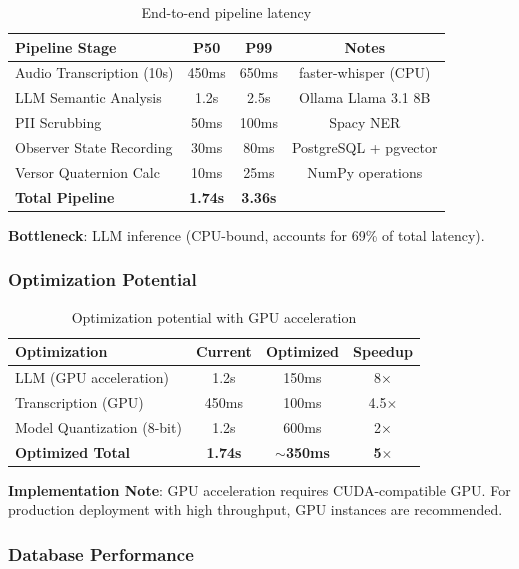 \documentclass[10pt,twocolumn]{article}
\begin{document}
\begin{table}[h]
\centering
\caption{End-to-end pipeline latency}
\label{tab:latency}
\begin{tabular}{lccc}
\toprule
\textbf{Pipeline Stage} & \textbf{P50} & \textbf{P99} & \textbf{Notes} \\
\midrule
Audio Transcription (10s) & 450ms & 650ms & faster-whisper (CPU) \\
LLM Semantic Analysis & 1.2s & 2.5s & Ollama Llama 3.1 8B \\
PII Scrubbing & 50ms & 100ms & Spacy NER \\
Observer State Recording & 30ms & 80ms & PostgreSQL + pgvector \\
Versor Quaternion Calc & 10ms & 25ms & NumPy operations \\
\midrule
\textbf{Total Pipeline} & \textbf{1.74s} & \textbf{3.36s} & \\
\bottomrule
\end{tabular}
\end{table}

\textbf{Bottleneck}: LLM inference (CPU-bound, accounts for 69\% of total latency).

\subsubsection{Optimization Potential}

\begin{table}[h]
\centering
\caption{Optimization potential with GPU acceleration}
\label{tab:optimization}
\begin{tabular}{lccc}
\toprule
\textbf{Optimization} & \textbf{Current} & \textbf{Optimized} & \textbf{Speedup} \\
\midrule
LLM (GPU acceleration) & 1.2s & 150ms & 8$\times$ \\
Transcription (GPU) & 450ms & 100ms & 4.5$\times$ \\
Model Quantization (8-bit) & 1.2s & 600ms & 2$\times$ \\
\midrule
\textbf{Optimized Total} & \textbf{1.74s} & \textbf{$\sim$350ms} & \textbf{5$\times$} \\
\bottomrule
\end{tabular}
\end{table}

\textbf{Implementation Note}: GPU acceleration requires CUDA-compatible GPU. For production deployment with high throughput, GPU instances are recommended.

\subsubsection{Database Performance}
\end{document}
